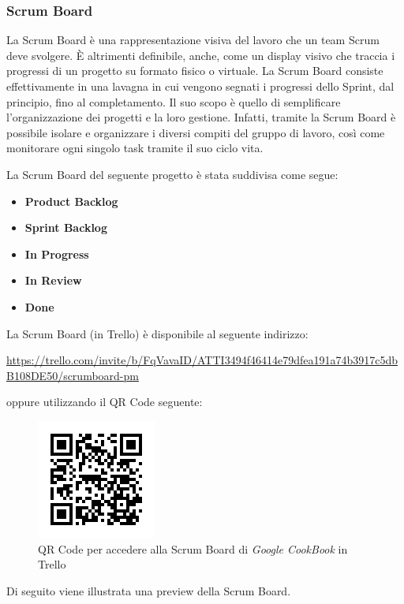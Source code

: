 \documentclass{article}
\begin{document}
\subsubsection{Scrum Board}
La Scrum Board è una rappresentazione visiva del lavoro che un team Scrum deve svolgere. 
È altrimenti definibile, anche, come un display visivo che traccia i progressi di un progetto su formato fisico o virtuale.
La Scrum Board consiste effettivamente in una lavagna in cui vengono segnati i progressi dello Sprint, dal principio, 
fino al completamento.
Il suo scopo è quello di semplificare l'organizzazione dei progetti e la loro gestione. 
Infatti, tramite la Scrum Board è possibile isolare e organizzare i diversi compiti del gruppo di lavoro, così come monitorare 
ogni singolo task tramite il suo ciclo vita. 

La Scrum Board del seguente progetto è stata suddivisa come segue:
\begin{itemize}
    \item \textbf{Product Backlog}
    \item \textbf{Sprint Backlog}
    \item \textbf{In Progress}
    \item \textbf{In Review}
    \item \textbf{Done}
\end{itemize}

La Scrum Board (in Trello) è disponibile al seguente indirizzo: 

\url{https://trello.com/invite/b/FqVavaID/ATTI3494f46414e79dfea191a74b3917c5dbB108DE50/scrumboard-pm}

oppure utilizzando il QR Code seguente:

\begin{figure}[h]
    \centering
    \includegraphics[scale=1]{./imgs/trello-board-qr-code.png}
    \caption{QR Code per accedere alla Scrum Board di \textit{Google CookBook} in Trello}
\end{figure}

Di seguito viene illustrata una preview della Scrum Board.
\end{document}
